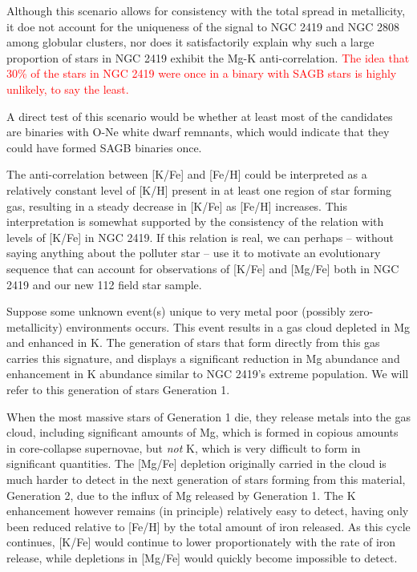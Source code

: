 \documentclass[a4paper,fleqn,usenatbib]{mnras}
\newcommand{\todo}[1]{\textcolor{red}{#1}}
\begin{document}
Although this scenario allows for consistency with the total spread in metallicity, it doe not account for the uniqueness of the signal to NGC 2419 and NGC 2808 among globular clusters, nor does it satisfactorily explain why such a large proportion of stars in NGC 2419 exhibit the Mg-K anti-correlation. \todo{The idea that 30\% of the stars in NGC 2419 were once in a binary with SAGB stars is highly unlikely, to say the least.}

A direct test of this scenario would be whether at least most of the candidates are binaries with O-Ne white dwarf remnants, which would indicate that they could have formed SAGB binaries once.

The anti-correlation between [K/Fe] and [Fe/H] could be interpreted as a relatively constant level of [K/H] present in at least one region of star forming gas, resulting in a steady decrease in [K/Fe] as [Fe/H] increases. This interpretation is somewhat supported by the consistency of the relation with levels of [K/Fe] in NGC 2419. If this relation is real, we can perhaps -- without saying anything about the polluter star -- use it to motivate an evolutionary sequence that can account for observations of [K/Fe] and [Mg/Fe] both in NGC 2419 and our new 112 field star sample.

Suppose some unknown event(s) unique to very metal poor (possibly zero-metallicity) environments occurs. This event results in a gas cloud depleted in Mg and enhanced in K. The generation of stars that form directly from this gas carries this signature, and displays a significant reduction in Mg abundance and enhancement in K abundance similar to NGC 2419's extreme population. We will refer to this generation of stars Generation 1.

When the most massive stars of Generation 1 die, they release metals into the gas cloud, including significant amounts of Mg, which is formed in copious amounts in core-collapse supernovae, but \textit{not} K, which is very difficult to form in significant quantities. The [Mg/Fe] depletion originally carried in the cloud is much harder to detect in the next generation of stars forming from this material, Generation 2, due to the influx of Mg released by Generation 1. The K enhancement however remains (in principle) relatively easy to detect, having only been reduced relative to [Fe/H] by the total amount of iron released. As this cycle continues, [K/Fe] would continue to lower proportionately with the rate of iron release, while depletions in [Mg/Fe] would quickly become impossible to detect.
\end{document}
